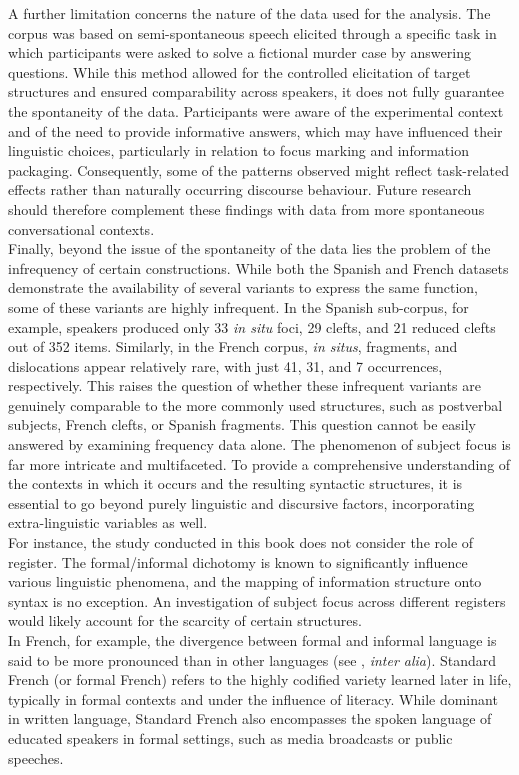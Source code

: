 A further limitation concerns the nature of the data used for the analysis. The corpus was based on semi-spontaneous speech elicited through a specific task in which participants were asked to solve a fictional murder case by answering questions. While this method allowed for the controlled elicitation of target structures and ensured comparability across speakers, it does not fully guarantee the spontaneity of the data. Participants were aware of the experimental context and of the need to provide informative answers, which may have influenced their linguistic choices, particularly in relation to focus marking and information packaging. Consequently, some of the patterns observed might reflect task-related effects rather than naturally occurring discourse behaviour. Future research should therefore complement these findings with data from more spontaneous conversational contexts.\\
Finally, beyond the issue of the spontaneity of the data lies the problem of the infrequency of certain constructions. While both the Spanish and French datasets demonstrate the availability of several variants to express the same function, some of these variants are highly infrequent. In the Spanish sub-corpus, for example, speakers produced only 33 \textit{in situ} foci, 29 clefts, and 21 reduced clefts out of 352 items. Similarly, in the French corpus, \textit{in situs}, fragments, and dislocations appear relatively rare, with just 41, 31, and 7 occurrences, respectively.
This raises the question of whether these infrequent variants are genuinely comparable to the more commonly used structures, such as postverbal subjects, French clefts, or Spanish fragments. This question cannot be easily answered by examining frequency data alone. The phenomenon of subject focus is far more intricate and multifaceted. To provide a comprehensive understanding of the contexts in which it occurs and the resulting syntactic structures, it is essential to go beyond purely linguistic and discursive factors, incorporating extra-linguistic variables as well.\\
For instance, the study conducted in this book does not consider the role of register. The formal/informal dichotomy is known to significantly influence various linguistic phenomena, and the mapping of information structure onto syntax is no exception. An investigation of subject focus across different registers would likely account for the scarcity of certain structures. \\
In French, for example, the divergence between formal and informal language is said to be more pronounced than in other languages (see \cite{blanche2006linguistic, katz2007teaching, hamlaoui2011role}, \textit{inter alia}). Standard French (or formal French) refers to the highly codified variety learned later in life, typically in formal contexts and under the influence of literacy. While dominant in written language, Standard French also encompasses the spoken language of educated speakers in formal settings, such as media broadcasts or public speeches.
